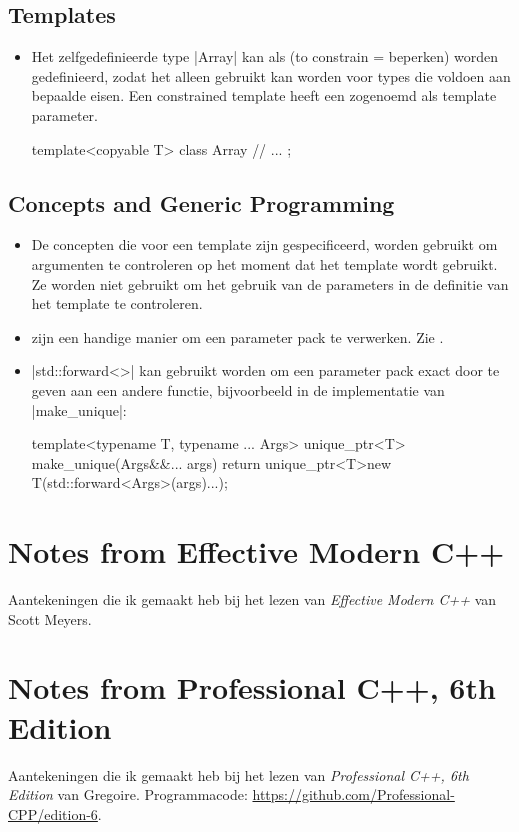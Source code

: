 \begin{cpplstShortInline}
\subsection{Templates}
\begin{itemize}
	\item
	Het zelfgedefinieerde type |Array| kan als  (to constrain = beperken) worden gedefinieerd, zodat het alleen gebruikt kan worden voor types die voldoen aan bepaalde eisen.
	Een constrained template heeft een zogenoemd  als template parameter.
\begin{cpplstfragment}
template<copyable T> class Array {
	// ...
};
\end{cpplstfragment}
\end{itemize}
\subsection{Concepts and Generic Programming}
\begin{itemize}
	\item
	De concepten die voor een template zijn gespecificeerd, worden gebruikt om argumenten te controleren op het moment dat het template wordt gebruikt.
	Ze worden niet gebruikt om het gebruik van de parameters in de definitie van het template te controleren.
	\item
	 zijn een handige manier om een parameter pack te verwerken.
	Zie .
	\item
	|std::forward<>| kan gebruikt worden om een parameter pack exact door te geven aan een andere functie, bijvoorbeeld in de implementatie van |make_unique|:
\begin{cpplstfragment}
template<typename T, typename ... Args>
unique_ptr<T> make_unique(Args&&... args) {
	return unique_ptr<T>{new T(std::forward<Args>(args)...)};
}
\end{cpplstfragment}
\end{itemize}

\section{Notes from Effective Modern C++}
Aantekeningen die ik gemaakt heb bij het lezen van \emph{Effective Modern C++} van Scott Meyers. 

\section{Notes from Professional C++, 6th Edition}
Aantekeningen die ik gemaakt heb bij het lezen van \emph{Professional C++, 6th Edition} van Gregoire.
Programmacode: \url{https://github.com/Professional-CPP/edition-6}.

\end{cpplstShortInline}
